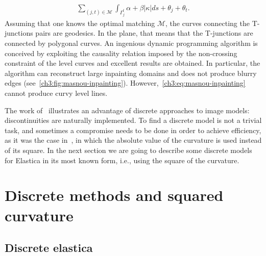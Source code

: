 \begin{align}
	\sum_{(j,t) \in \mathcal{M}}{ \int_{\Gamma_j^t}{\alpha + \beta |\kappa|ds} + \theta_j + \theta_t }.
	\label{ch3:eq:masnou-inpainting}
\end{align}
%
%
Assuming that one knows the optimal matching $\mathcal{M}$, the curves connecting the T-junctions pairs are geodesics. In the plane, that means that the T-junctions are connected by polygonal curves. An ingenious dynamic programming algorithm is conceived  by exploiting the causality relation imposed by the non-crossing constraint of the level curves and excellent results are obtained. In particular, the algorithm can reconstruct large inpainting domains and does not produce blurry edges (see~\cref{ch3:fig:masnou-inpainting}). However,~\cref{ch3:eq:masnou-inpainting} cannot produce curvy level lines.


The work of~\cite{masnou98inpainting} illustrates an advantage of discrete approaches to image models: discontinuities are naturally implemented. To find a discrete model is not a trivial task, and sometimes a compromise needs to be done in order to achieve efficiency, as it was the case in~\cite{masnou98inpainting}, in which the absolute value of the curvature is used instead of its square. In the next section we are going to describe some discrete models for Elastica in its most known form, i.e., using the square of the curvature.


\section{Discrete methods and squared curvature}
\label{ch3:sec:discrete-methods-squared-curvature}

\subsection{Discrete elastica}


